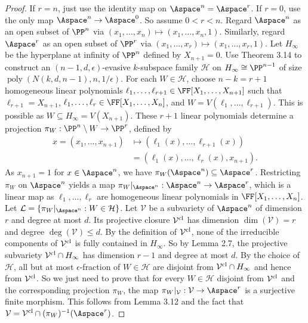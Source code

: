 \begin{proof}
If $r=n$, just use the identity map on $\Aspace^n=\Aspace^r$. If $r=0$, use the only map $\Aspace^n\to\Aspace^0$. So assume $0<r<n$. Regard $\Aspace^n$ as an open subset of $\PP^n$ via $(x_1,\ldots,x_n)\mapsto(x_1,\ldots,x_n,1)$. Similarly, regard $\Aspace^r$ as an open subset of $\PP^r$ via $(x_1,\ldots,x_r)\mapsto(x_1,\ldots,x_r,1)$. Let $H_\infty$ be the hyperplane at infinity of $\PP^n$ defined by $X_{n+1}=0$.
Use Theorem 3.14 to construct an $(n-1,d,\epsilon)$-evasive $k$-subspace family $\mathcal H$ on $H_\infty\cong\PP^{n-1}$ of size $\operatorname{poly}(N(k,d,n-1),n,1/\epsilon)$. For each $W\in\mathcal H$, choose $n-k=r+1$ homogeneous linear polynomials $\ell_1,\ldots,\ell_{r+1}\in\FF[X_1,\ldots,X_{n+1}]$ such that $\ell_{r+1}=X_{n+1}$, $\ell_1,\ldots,\ell_r\in\FF[X_1,\ldots,X_n]$, and $W=V(\ell_1,\ldots,\ell_{r+1})$. This is possible as $W\subseteq H_\infty=V(X_{n+1})$.
These $r+1$ linear polynomials determine a projection $\pi_W:\PP^n\setminus W\to\PP^r$, defined by
\begin{align*}
x=(x_1,\ldots,x_{n+1})&\mapsto(\ell_1(x),\ldots,\ell_{r+1}(x))\\
&=(\ell_1(x),\ldots,\ell_r(x),x_{n+1}).
\end{align*}
As $x_{n+1}=1$ for $x\in\Aspace^n$, we have $\pi_W(\Aspace^n)\subseteq\Aspace^r$. Restricting $\pi_W$ on $\Aspace^n$ yields a map $\pi_W|_{\Aspace^n}:\Aspace^n\to\Aspace^r$, which is a linear map as $\ell_1,\ldots,\ell_r$ are homogeneous linear polynomials in $\FF[X_1,\ldots,X_n]$. Let $\mathcal L=\{\pi_W|_{\Aspace^n}:W\in\mathcal H\}$.
Let $\mathcal V$ be a subvariety of $\Aspace^n$ of dimension $r$ and degree at most $d$. Its projective closure $\mathcal V^{\rm cl}$ has dimension $\dim(\mathcal V)=r$ and degree $\deg(\mathcal V)\le d$. By the definition of $\mathcal V^{\rm cl}$, none of the irreducible components of $\mathcal V^{\rm cl}$ is fully contained in $H_\infty$. So by Lemma 2.7, the projective subvariety $\mathcal V^{\rm cl}\cap H_\infty$ has dimension $r-1$ and degree at most $d$.
By the choice of $\mathcal H$, all but at most $\epsilon$-fraction of $W\in\mathcal H$ are disjoint from $\mathcal V^{\rm cl}\cap H_\infty$ and hence from $\mathcal V^{\rm cl}$. So we just need to prove that for every $W\in\mathcal H$ disjoint from $\mathcal V^{\rm cl}$ and the corresponding projection $\pi_W$, the map $\pi_W|_{\mathcal V}:\mathcal V\to\Aspace^r$ is a surjective finite morphism. This follows from Lemma 3.12 and the fact that $\mathcal V=\mathcal V^{\rm cl}\cap(\pi_W)^{-1}(\Aspace^r)$.
\end{proof}
